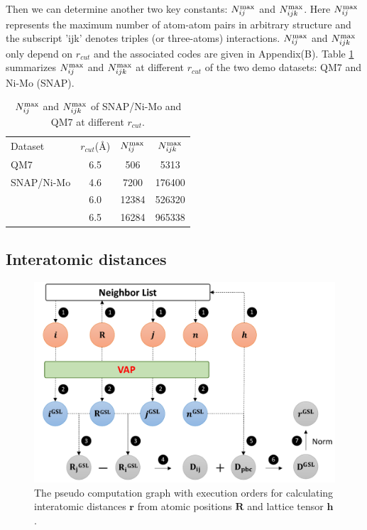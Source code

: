 \documentclass[final,1p,times]{elsarticle}
\begin{document}
Then we can determine another two key constants: $N_{ij}^{\mathrm{max}}$ and $N_{ijk}^{\mathrm{max}}$. 
Here $N_{ij}^{\mathrm{max}}$ represents the maximum number of atom-atom pairs in
arbitrary structure and the subscript 'ijk' denotes triples 
(or three-atoms) interactions. $N_{ij}^{\mathrm{max}}$ and $N_{ijk}^{\mathrm{max}}$ only depend on 
$r_{cut}$ and the associated codes are given in Appendix(B). 
Table \ref{table:nij_nijk_max} summarizes $N_{ij}^{\mathrm{max}}$ and $N_{ijk}^{\mathrm{max}}$ at different
$r_{cut}$ of the two demo datasets: QM7 and Ni-Mo (SNAP).

% 
%
\begin{table}[h]
\centering
\begin{tabular}{lccc}
\hline
 Dataset & $r_{cut}$(\AA) & $N_{ij}^{\mathrm{max}}$ & $N_{ijk}^{\mathrm{max}}$ \\
 QM7 & 6.5 & 506 & 5313 \\
\hline
 SNAP/Ni-Mo &  4.6 & 7200 & 176400 \\
 & 6.0 & 12384 & 526320 \\
 & 6.5 & 16284 & 965338 \\
\hline
\hline
\end{tabular}
\caption{\label{table:nij_nijk_max}
$N_{ij}^{\mathrm{max}}$ and $N_{ijk}^{\mathrm{max}}$ of SNAP/Ni-Mo and QM7 at different $r_{cut}$.
}
\end{table}

% 
%
\subsection{Interatomic distances}
\label{section:interatomic_distance}

% 
%
\begin{figure}[h!]
\centering
\includegraphics[scale=0.6]{figures/Fig3.pdf}
\caption{\label{fig:Fig3} The pseudo computation graph with execution orders for 
calculating interatomic distances $\mathbf{r}$ from atomic positions 
$\mathbf{R}$ and lattice tensor $\mathbf{h}$.
}
\end{figure}
\end{document}
